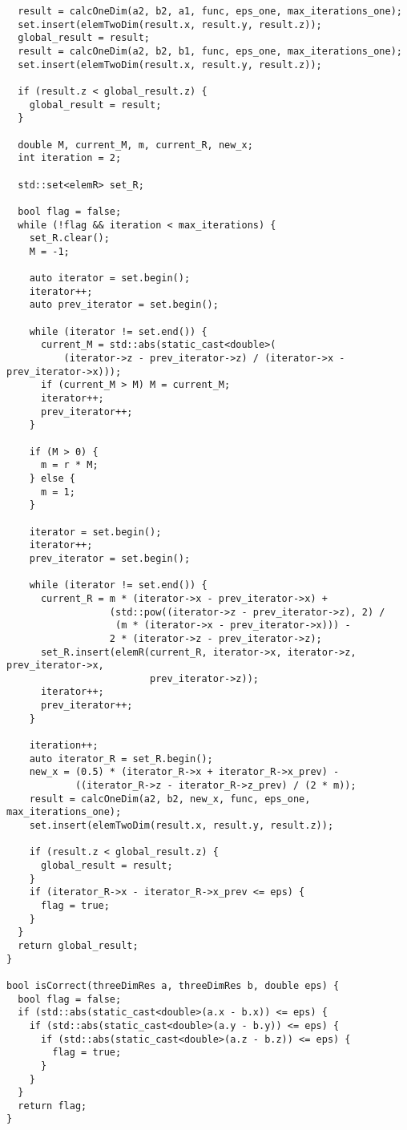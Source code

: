 \documentclass{report}
\begin{document}
\begin{lstlisting}
  result = calcOneDim(a2, b2, a1, func, eps_one, max_iterations_one);
  set.insert(elemTwoDim(result.x, result.y, result.z));
  global_result = result;
  result = calcOneDim(a2, b2, b1, func, eps_one, max_iterations_one);
  set.insert(elemTwoDim(result.x, result.y, result.z));

  if (result.z < global_result.z) {
    global_result = result;
  }

  double M, current_M, m, current_R, new_x;
  int iteration = 2;

  std::set<elemR> set_R;

  bool flag = false;
  while (!flag && iteration < max_iterations) {
    set_R.clear();
    M = -1;

    auto iterator = set.begin();
    iterator++;
    auto prev_iterator = set.begin();

    while (iterator != set.end()) {
      current_M = std::abs(static_cast<double>(
          (iterator->z - prev_iterator->z) / (iterator->x - prev_iterator->x)));
      if (current_M > M) M = current_M;
      iterator++;
      prev_iterator++;
    }

    if (M > 0) {
      m = r * M;
    } else {
      m = 1;
    }

    iterator = set.begin();
    iterator++;
    prev_iterator = set.begin();

    while (iterator != set.end()) {
      current_R = m * (iterator->x - prev_iterator->x) +
                  (std::pow((iterator->z - prev_iterator->z), 2) /
                   (m * (iterator->x - prev_iterator->x))) -
                  2 * (iterator->z - prev_iterator->z);
      set_R.insert(elemR(current_R, iterator->x, iterator->z, prev_iterator->x,
                         prev_iterator->z));
      iterator++;
      prev_iterator++;
    }

    iteration++;
    auto iterator_R = set_R.begin();
    new_x = (0.5) * (iterator_R->x + iterator_R->x_prev) -
            ((iterator_R->z - iterator_R->z_prev) / (2 * m));
    result = calcOneDim(a2, b2, new_x, func, eps_one, max_iterations_one);
    set.insert(elemTwoDim(result.x, result.y, result.z));

    if (result.z < global_result.z) {
      global_result = result;
    }
    if (iterator_R->x - iterator_R->x_prev <= eps) {
      flag = true;
    }
  }
  return global_result;
}

bool isCorrect(threeDimRes a, threeDimRes b, double eps) {
  bool flag = false;
  if (std::abs(static_cast<double>(a.x - b.x)) <= eps) {
    if (std::abs(static_cast<double>(a.y - b.y)) <= eps) {
      if (std::abs(static_cast<double>(a.z - b.z)) <= eps) {
        flag = true;
      }
    }
  }
  return flag;
}

\end{lstlisting}
\end{document}
